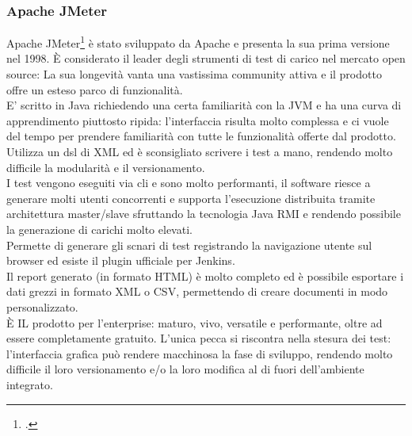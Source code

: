 \subsubsection{Apache JMeter}
Apache JMeter\footcite{site:jmeter} è stato sviluppato da Apache e presenta la sua prima versione nel 1998. È considerato il leader degli strumenti di test di carico nel mercato open source: La sua longevità vanta una vastissima community attiva e il prodotto offre un esteso parco di funzionalità.\\ 
E’ scritto in Java richiedendo una certa familiarità con la JVM e ha una curva di apprendimento piuttosto ripida: l’interfaccia risulta molto complessa e ci vuole del tempo per prendere familiarità con tutte le funzionalità offerte dal prodotto.\\
Utilizza un \gls{dsl} di XML ed è sconsigliato scrivere i test a mano, rendendo molto difficile la modularità e il versionamento.\\
I test vengono eseguiti via \gls{cli} e sono molto performanti, il software riesce a generare molti utenti concorrenti e supporta l’esecuzione distribuita tramite architettura master/slave sfruttando la tecnologia Java RMI e rendendo possibile la generazione di carichi molto elevati. \\
Permette di generare gli scnari di test registrando la navigazione utente sul browser ed esiste il plugin  ufficiale per Jenkins.\\
Il report generato (in formato HTML) è molto completo ed è possibile esportare i dati grezzi in formato XML o CSV, permettendo di creare documenti in modo personalizzato. \\
È IL prodotto per l’enterprise: maturo, vivo, versatile e performante, oltre ad essere completamente gratuito. L'unica pecca si riscontra nella stesura dei test: l'interfaccia grafica può rendere macchinosa la fase di sviluppo, rendendo molto difficile il loro versionamento e/o la loro modifica al di fuori dell'ambiente integrato.
